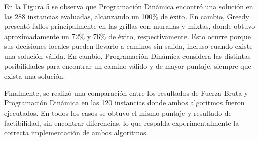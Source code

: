 En la Figura 5 se observa que Programación Dinámica encontró una solución en las 288 instancias evaluadas, alcanzando un 100\% de éxito. En cambio, Greedy presentó fallos principalmente en las grillas con murallas y mixtas, donde obtuvo aproximadamente un 72\% y 76\% de éxito, respectivamente. Esto ocurre porque sus decisiones locales pueden llevarlo a caminos sin salida, incluso cuando existe una solución válida. En cambio, Programación Dinámica considera las distintas posibilidades para encontrar un camino válido y de mayor puntaje, siempre que exista una solución.

Finalmente, se realizó una comparación entre los resultados de Fuerza Bruta y Programación Dinámica en las 120 instancias donde ambos algoritmos fueron ejecutados. En todos los casos se obtuvo el mismo puntaje y resultado de factibilidad, sin encontrar diferencias, lo que respalda experimentalmente la correcta implementación de ambos algoritmos.